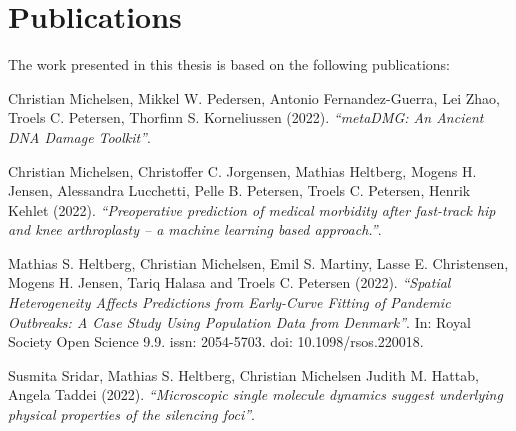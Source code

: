 \chapter{Publications}

The work presented in this thesis is based on the following publications:

\vspace{1.5cm}



\begin{description} [labelindent=1cm,style=multiline,leftmargin=3cm]
    \item [Paper 1:] Christian Michelsen, Mikkel W. Pedersen, Antonio Fernandez-Guerra, Lei Zhao, Troels C. Petersen, Thorfinn S. Korneliussen (2022). \emph{``metaDMG: An Ancient DNA Damage Toolkit''}. \\
    \item [Paper 2:] Christian Michelsen, Christoffer C. Jorgensen, Mathias Heltberg, Mogens H. Jensen, Alessandra Lucchetti, Pelle B. Petersen, Troels C. Petersen, Henrik Kehlet (2022). \emph{``Preoperative prediction of medical morbidity after fast-track hip and knee arthroplasty -- a machine learning based approach.''}. \\
    \item [Paper 3:] Mathias S. Heltberg, Christian Michelsen, Emil S. Martiny, Lasse E. Christensen, Mogens H. Jensen, Tariq Halasa and Troels C. Petersen (2022). \emph{``Spatial Heterogeneity Affects Predictions from Early-Curve Fitting of Pandemic Outbreaks: A Case Study Using Population Data from Denmark''}. In: Royal Society Open Science 9.9. issn: 2054-5703. doi: 10.1098/rsos.220018. \\
    \item [Paper 4:] Susmita Sridar, Mathias S. Heltberg, Christian Michelsen Judith M. Hattab, Angela Taddei (2022). \emph{``Microscopic single molecule dynamics suggest underlying physical properties of the silencing foci''}.
\end{description}


